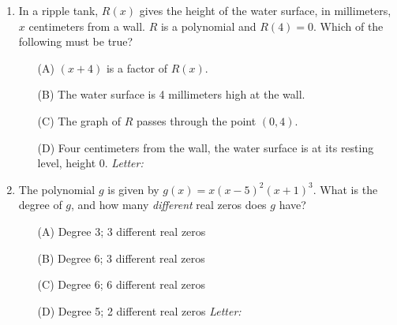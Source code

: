 \documentclass[10pt]{article}
\begin{document}
\begin{enumerate}[leftmargin=1.9em, itemsep=10pt]

\item In a ripple tank, $R(x)$ gives the height of the water surface, in millimeters, $x$
      centimeters from a wall. $R$ is a polynomial and $R(4) = 0$. Which of the following must be
      true?
      \begin{enumerate}[leftmargin=2.6em, itemsep=2pt]
        \item[(A)] $(x + 4)$ is a factor of $R(x)$.
        \item[(B)] The water surface is 4 millimeters high at the wall.
        \item[(C)] The graph of $R$ passes through the point $(0, 4)$.
        \item[(D)] Four centimeters from the wall, the water surface is at its resting level, height 0.
        \hfill\textit{Letter:}~\gradedblank[id=ap1, type=choice, points=1, answer=D]{0.42in}{13pt}
      \end{enumerate}

\item The polynomial $g$ is given by $g(x) = x(x - 5)^2(x + 1)^3$. What is the degree of $g$, and
      how many \emph{different} real zeros does $g$ have?
      \begin{enumerate}[leftmargin=2.6em, itemsep=2pt]
        \item[(A)] Degree 3; 3 different real zeros
        \item[(B)] Degree 6; 3 different real zeros
        \item[(C)] Degree 6; 6 different real zeros
        \item[(D)] Degree 5; 2 different real zeros \hfill\textit{Letter:}~\gradedblank[id=ap2, type=choice, points=1, answer=B]{0.42in}{13pt}
      \end{enumerate}


\end{enumerate}
\end{document}
